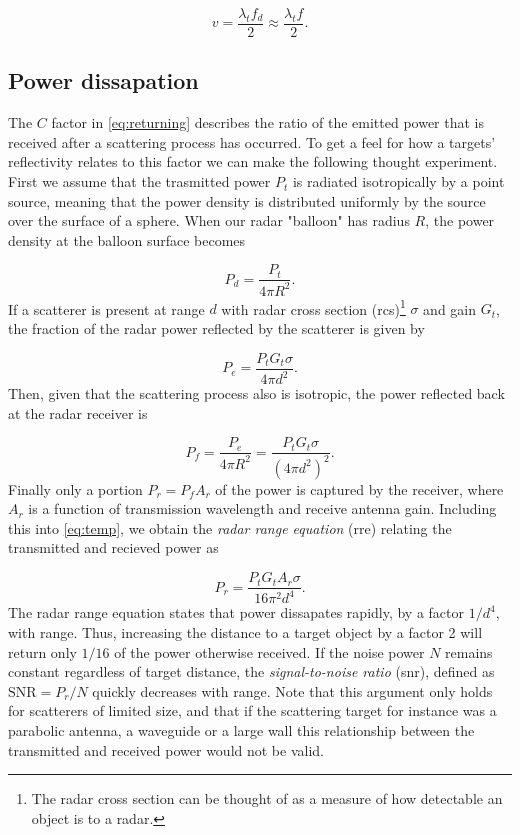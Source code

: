 \begin{equation}\label{eq:dopp}
	v = \frac{\lambda_t f_d}{2}
	\approx \frac{\lambda_t f}{2}.
\end{equation}


\subsection{Power dissapation}

The $C$ factor in \ref{eq:returning} describes the ratio of the emitted power that is received after a scattering process has occurred. To get a feel for how a targets' reflectivity relates to this factor we can make the following thought experiment. First we assume that the trasmitted power $P_t$ is radiated isotropically by a point source, meaning that the power density is distributed uniformly by the source over the surface of a sphere. When our radar "balloon" has radius $R$, the power density at the balloon surface becomes  \citep{amin_2017}

\begin{equation}
	P_d 
	= \frac{P_t}{4\pi R^2}.
\end{equation}
If a scatterer is present at range $d$ with radar cross section (\gls{rcs})\footnote{The radar cross section can be thought of as a measure of how detectable an object is to a radar.} $\sigma$ and gain $G_t$, the fraction of the radar power reflected by the scatterer is given by 

\begin{equation}
	P_{e}
	= \frac{P_tG_t\sigma}{4\pi d^2}.
\end{equation}
Then, given that the scattering process also is isotropic, the power reflected back at the radar receiver is

\begin{equation}\label{eq:temp}
	P_f 
	= \frac{P_e}{4\pi R^2} 
	= \frac{P_t G_t \sigma}{(4\pi d^2)^2}.
\end{equation}
Finally only a portion $P_r = P_fA_r$ of the power is captured by the receiver, where $A_r$ is a function of transmission wavelength and receive antenna gain. Including this into \ref{eq:temp}, we obtain the \emph{radar range equation} (\gls{rre}) relating the transmitted and recieved power as

\begin{equation}
	P_r
	= \frac{P_t G_t A_r \sigma}{16\pi^2 d^4}.
\end{equation}
The radar range equation states that power dissapates rapidly, by a factor $1/d^4$, with range. Thus, increasing the distance to a target object by a factor 2 will return only $1/16$ of the power otherwise received. If the noise power $N$ remains constant regardless of target distance, the \emph{signal-to-noise ratio} (\gls{snr}), defined as $\text{SNR} = P_r/N$ quickly decreases with range. Note that this argument only holds for scatterers of limited size, and that if the scattering target for instance was a parabolic antenna, a waveguide or a large wall this relationship between the transmitted and received power would not be valid. 

